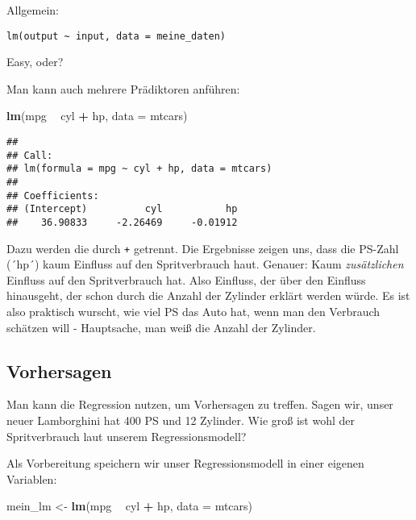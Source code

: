 \documentclass[]{article}
\newenvironment{Shaded}{\begin{snugshade}}{\end{snugshade}}
\newcommand{\DataTypeTok}[1]{\textcolor[rgb]{0.13,0.29,0.53}{#1}}
\newcommand{\KeywordTok}[1]{\textcolor[rgb]{0.13,0.29,0.53}{\textbf{#1}}}
\newcommand{\NormalTok}[1]{#1}
\newcommand{\OperatorTok}[1]{\textcolor[rgb]{0.81,0.36,0.00}{\textbf{#1}}}
\newcommand{\StringTok}[1]{\textcolor[rgb]{0.31,0.60,0.02}{#1}}
\begin{document}
Allgemein:

\begin{verbatim}
lm(output ~ input, data = meine_daten)
\end{verbatim}

Easy, oder?

Man kann auch mehrere Prädiktoren anführen:

\begin{Shaded}
\begin{Highlighting}[]
\KeywordTok{lm}\NormalTok{(mpg }\OperatorTok{~}\StringTok{ }\NormalTok{cyl }\OperatorTok{+}\StringTok{ }\NormalTok{hp, }\DataTypeTok{data =}\NormalTok{ mtcars)}
\end{Highlighting}
\end{Shaded}

\begin{verbatim}
## 
## Call:
## lm(formula = mpg ~ cyl + hp, data = mtcars)
## 
## Coefficients:
## (Intercept)          cyl           hp  
##    36.90833     -2.26469     -0.01912
\end{verbatim}

Dazu werden die durch \texttt{+} getrennt. Die Ergebnisse zeigen uns,
dass die PS-Zahl (´hp´) kaum Einfluss auf den Spritverbrauch haut.
Genauer: Kaum \emph{zusätzlichen} Einfluss auf den Spritverbrauch hat.
Also Einfluss, der über den Einfluss hinausgeht, der schon durch die
Anzahl der Zylinder erklärt werden würde. Es ist also praktisch wurscht,
wie viel PS das Auto hat, wenn man den Verbrauch schätzen will -
Hauptsache, man weiß die Anzahl der Zylinder.

\hypertarget{vorhersagen}{%
\subsection{Vorhersagen}\label{vorhersagen}}

Man kann die Regression nutzen, um Vorhersagen zu treffen. Sagen wir,
unser neuer Lamborghini hat 400 PS und 12 Zylinder. Wie groß ist wohl
der Spritverbrauch laut unserem Regressionsmodell?

Als Vorbereitung speichern wir unser Regressionsmodell in einer eigenen
Variablen:

\begin{Shaded}
\begin{Highlighting}[]
\NormalTok{mein_lm <-}\StringTok{ }\KeywordTok{lm}\NormalTok{(mpg }\OperatorTok{~}\StringTok{ }\NormalTok{cyl }\OperatorTok{+}\StringTok{ }\NormalTok{hp, }\DataTypeTok{data =}\NormalTok{ mtcars)}
\end{Highlighting}
\end{Shaded}
\end{document}
